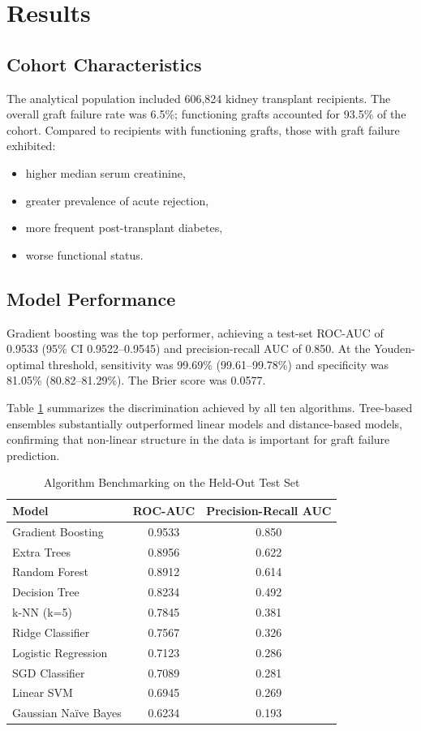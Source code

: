 \documentclass[11pt,a4paper]{article}
\begin{document}
\section{Results}

\subsection{Cohort Characteristics}
The analytical population included 606,824 kidney transplant recipients. The overall graft failure rate was 6.5\%; functioning grafts accounted for 93.5\% of the cohort. Compared to recipients with functioning grafts, those with graft failure exhibited:
\begin{itemize}
    \item higher median serum creatinine,
    \item greater prevalence of acute rejection,
    \item more frequent post-transplant diabetes,
    \item worse functional status.
\end{itemize}

\subsection{Model Performance}
Gradient boosting was the top performer, achieving a test-set ROC-AUC of 0.9533 (95\% CI 0.9522--0.9545) and precision-recall AUC of 0.850. At the Youden-optimal threshold, sensitivity was 99.69\% (99.61--99.78\%) and specificity was 81.05\% (80.82--81.29\%). The Brier score was 0.0577.

Table \ref{tab:bechmarking} summarizes the discrimination achieved by all ten algorithms. Tree-based ensembles substantially outperformed linear models and distance-based models, confirming that non-linear structure in the data is important for graft failure prediction.

\begin{table}[H]
\centering
\caption{Algorithm Benchmarking on the Held-Out Test Set}
\label{tab:bechmarking}
\small
\begin{tabular}{lcc}
\toprule
\textbf{Model} & \textbf{ROC-AUC} & \textbf{Precision-Recall AUC} \\
\midrule
Gradient Boosting & 0.9533 & 0.850 \\
Extra Trees & 0.8956 & 0.622 \\
Random Forest & 0.8912 & 0.614 \\
Decision Tree & 0.8234 & 0.492 \\
k-NN (k=5) & 0.7845 & 0.381 \\
Ridge Classifier & 0.7567 & 0.326 \\
Logistic Regression & 0.7123 & 0.286 \\
SGD Classifier & 0.7089 & 0.281 \\
Linear SVM & 0.6945 & 0.269 \\
Gaussian Naïve Bayes & 0.6234 & 0.193 \\
\bottomrule
\end{tabular}
\end{table}
\end{document}
